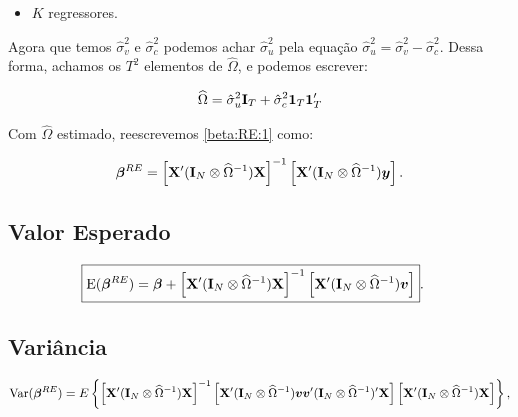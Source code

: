 \documentclass[11pt, oneside, a4paper, article]{article}
\numberwithin{equation}{section}
\begin{document}
\begin{description}
\begin{itemize}
\item $K$ regressores.
\end{itemize}

Agora que temos $\hat{\sigma}^2_{v}$ e $\hat{\sigma}^2_{c}$ podemos achar $\hat{\sigma}^{2}_{u}$ pela equação $\boxed{\hat{\sigma}_{u}^{2} = \hat{\sigma}_{v}^{2} - \hat{\sigma}_{c}^{2}}$.
Dessa forma, achamos os $T^2$ elementos de $\widehat{\Omega}$, e podemos escrever:

\vspace{-1 em}
\begin{align*}
\widehat{\Omega}
= 
\hat{\sigma}^{2}_{u} \mathbf{I}_{T} + \hat{\sigma}_{c}^{2} \boldsymbol{1}_{T} \boldsymbol{1}_{T}'
\end{align*}

Com $\widehat{\Omega}$ estimado, reescrevemos \eqref{beta:RE:1} como:

\vspace{-1 em}
\begin{align} \label{beta:RE:2}
\boldsymbol{\beta}^{RE} = 
\left[ \mathbf{X}' (\mathbf{I}_{N} \otimes \widehat{\Omega}^{-1}) \mathbf{X} \right]^{-1}
\left[ \mathbf{X}' (\mathbf{I}_{N} \otimes \widehat{\Omega}^{-1}) \boldsymbol{y} \right].
\end{align}


\subsection{Valor Esperado}

\vspace{-1 em}
\begin{align*}
	\Aboxed{
\E( \betavec^{RE} ) = 
\betavec +
\left[ \Xmat' (\Imat_{N} \otimes \widehat{\Omega}^{-1}) \Xmat \right]^{-1}
\left[ \Xmat' (\Imat_{N} \otimes \widehat{\Omega}^{-1}) \mbs{v} \right] }.
\end{align*}

\subsection{Variância}

\vspace{-1 em}
\begin{align*} 
\text{Var}( \boldsymbol{\beta}^{RE} ) = 
E
\left\{ 
\left[ \mathbf{X}' ( \mathbf{I}_{N} \otimes \widehat{\Omega}^{-1} ) \mathbf{X} \right]^{-1}
\left[
\mathbf{X}' ( \mathbf{I}_{N} \otimes \widehat{\Omega}^{-1} )
\boldsymbol{v} \boldsymbol{v}'
( \mathbf{I}_{N} \otimes \widehat{\Omega}^{-1} )' \mathbf{X}
\right]
\left[ \mathbf{X}' ( \mathbf{I}_{N} \otimes \widehat{\Omega}^{-1} ) \mathbf{X} \right]
\right\},
\end{align*}


\end{description}
\end{document}
